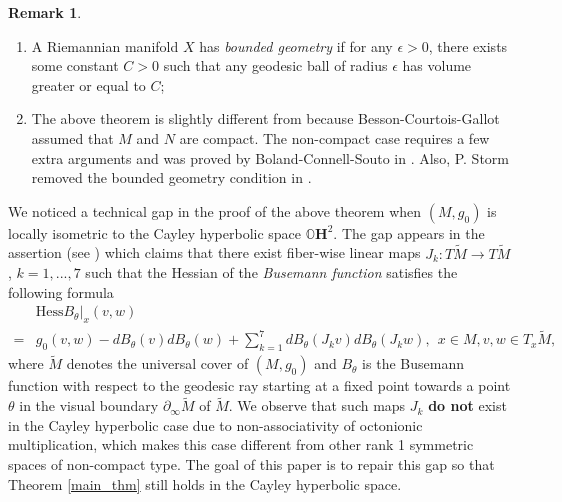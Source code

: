 \documentclass{article}
\newcommand{\OO}{\mathbb{O}}
\newcommand{\del}{\partial}
\newcommand{\hess}{\mathrm{Hess}}
\theoremstyle{definition}
\newtheorem*{rmk}{Remark}
\begin{document}
\begin{rmk}
\begin{enumerate}
\item[(1).] A Riemannian manifold $X$ has \emph{bounded geometry} if for any $\epsilon>0$, there exists some constant $C>0$ such that any geodesic ball of radius $\epsilon$ has volume greater or equal to $C$;
\item[(2).] The above theorem is slightly different from \cite[Theor\`em\'e principal]{BCG1} because Besson-Courtois-Gallot assumed that $M$ and $N$ are compact. The non-compact case requires a few extra arguments and was proved by Boland-Connell-Souto in \cite[Theorem 1.3]{BCS}. Also, P. Storm removed the bounded geometry condition in \cite[Theorem 1.1]{Storm}.
\end{enumerate}
\end{rmk}
We noticed a technical gap in the proof of the above theorem when $(M,g_0)$ is locally isometric to the Cayley hyperbolic space $\OO\mathbf{H}^2$. The gap appears in the assertion (see \cite[page 751]{BCG1}) which claims that there exist fiber-wise linear maps $J_k:T\widetilde M\to T\widetilde M$, $k=1,...,7$ such that the Hessian of the \emph{Busemann function} satisfies the following formula
\begin{align*}&\hess B_\theta|_x(v,w) \\
=&g_0(v,w)-dB_\theta(v)dB_\theta(w)+\sum_{k=1}^7dB_\theta(J_kv)dB_\theta(J_kw), ~~x\in M, v,w\in T_x\widetilde M,
\end{align*}
where $\widetilde M$ denotes the universal cover of $(M,g_0)$ and $B_\theta$ is the Busemann function with respect to the geodesic ray starting at a fixed point towards a point $\theta$ in the visual boundary $\del_\infty \widetilde M$ of $\widetilde M$.
We observe that such maps $J_k$ \textbf{do not} exist in the Cayley hyperbolic case due to non-associativity of octonionic multiplication, which makes this case different from other rank 1 symmetric spaces of non-compact type. The goal of this paper is to repair this gap so that Theorem \ref{main_thm} still holds in the Cayley hyperbolic space.
\end{document}
